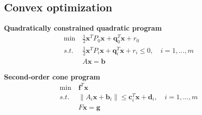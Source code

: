 \documentclass[runningheads]{llncs}
\begin{document}
\subsection{Convex optimization}
\noindent\textbf{Quadratically constrained quadratic program}
\begin{align}
    \min \ &\frac{1}{2} \mathbf{x}^T P_0 \mathbf{x}
    + \mathbf{q}_0^T \mathbf{x} + r_0 \\
    s.t. \ &\frac{1}{2} \mathbf{x}^T P_i \mathbf{x}
    + \mathbf{q}_i^T \mathbf{x} + r_i \leq 0, \quad i = 1,...,m \\
    & A \mathbf{x} = \mathbf{b}
\end{align}

\par
\noindent\textbf{Second-order cone program}
\begin{align}
    \min \ & \mathbf{f}^T \mathbf{x} \\
    s.t. \ & \parallel A_i \mathbf{x} + \mathbf{b}_i \parallel
    \leq \mathbf{c}_i^T\mathbf{x} + \mathbf{d}_i, \quad i = 1,...,m \\
    & F\mathbf{x} = \mathbf{g}
\end{align}
\end{document}

